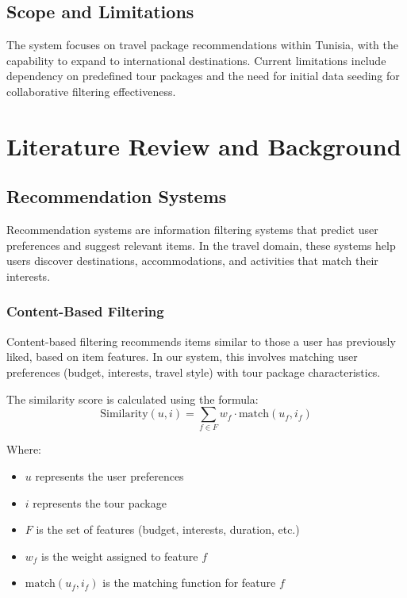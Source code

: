 \documentclass[12pt,a4paper]{article}
\begin{document}
\subsection{Scope and Limitations}
The system focuses on travel package recommendations within Tunisia, with the capability to expand to international destinations. Current limitations include dependency on predefined tour packages and the need for initial data seeding for collaborative filtering effectiveness.

\newpage

\section{Literature Review and Background}

\subsection{Recommendation Systems}
Recommendation systems are information filtering systems that predict user preferences and suggest relevant items. In the travel domain, these systems help users discover destinations, accommodations, and activities that match their interests.

\subsubsection{Content-Based Filtering}
Content-based filtering recommends items similar to those a user has previously liked, based on item features. In our system, this involves matching user preferences (budget, interests, travel style) with tour package characteristics.

The similarity score is calculated using the formula:
$$\text{Similarity}(u,i) = \sum_{f \in F} w_f \cdot \text{match}(u_f, i_f)$$

Where:
\begin{itemize}
    \item $u$ represents the user preferences
    \item $i$ represents the tour package
    \item $F$ is the set of features (budget, interests, duration, etc.)
    \item $w_f$ is the weight assigned to feature $f$
    \item $\text{match}(u_f, i_f)$ is the matching function for feature $f$
\end{itemize}
\end{document}
